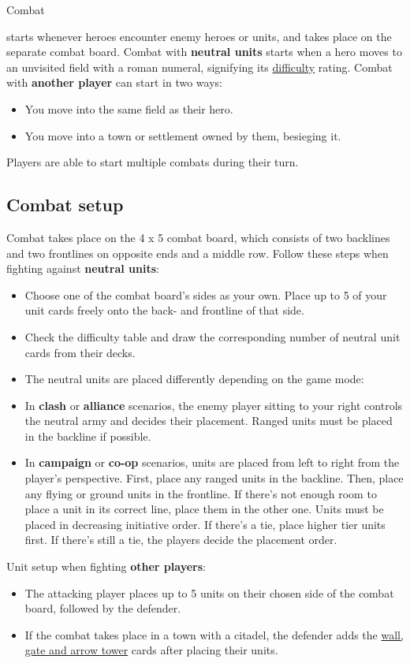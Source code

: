 \hypertarget{Combat}{Combat} starts whenever heroes encounter enemy heroes or units, and takes place on the separate combat board.
Combat with \textbf{neutral units} starts when a hero moves to an unvisited field with a roman numeral, signifying its \hyperlink{Difficulty}{difficulty} rating.
Combat with \textbf{another player} can start in two ways:
\begin{itemize}
  \item You move into the same field as their hero.
  \item You move into a town or settlement owned by them, besieging it.
\end{itemize}
Players are able to start multiple combats during their turn.

\subsection*{\hypertarget{Combatsetup}{Combat setup}}

Combat takes place on the 4 x 5 combat board, which consists of two backlines and two frontlines on opposite ends and a middle row.
Follow these steps when fighting against \textbf{neutral units}:

\begin{itemize}
  \item Choose one of the combat board’s sides as your own.
Place up to 5 of your unit cards freely onto the back- and frontline of that side.
  \item Check the difficulty table and draw the corresponding number of neutral unit cards from their decks.
  \item The neutral units are placed differently depending on the game mode:
  \item In \textbf{clash} or \textbf{alliance} scenarios, the enemy player sitting to your right controls the neutral army and decides their placement.
Ranged units must be placed in the backline if possible.
  \item In \textbf{campaign} or \textbf{co-op} scenarios, units are placed from left to right from the player's perspective.
First, place any ranged units in the backline.
Then, place any flying or ground units in the frontline.
If there's not enough room to place a unit in its correct line, place them in the other one.
Units must be placed in decreasing initiative order.
If there's a tie, place higher tier units first.
If there's still a tie, the players decide the placement order.
\end{itemize}
Unit setup when fighting \textbf{other players}:
\begin{itemize}[wide]
  \item The attacking player places up to 5 units on their chosen side of the combat board, followed by the defender.
  \item If the combat takes place in a town with a citadel, the defender adds the \hyperlink{Walls}{wall, gate and arrow tower} cards after placing their units.
\end{itemize}

